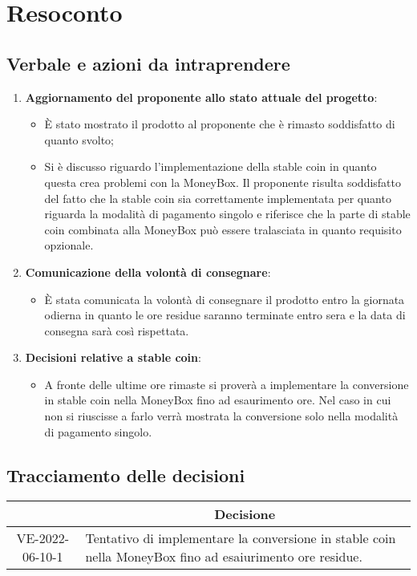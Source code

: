 \section{Resoconto}
\subsection{Verbale e azioni da intraprendere}

\begin{enumerate}
	\item \textbf{Aggiornamento del proponente allo stato attuale del progetto}:
	\begin{itemize}
		\item È stato mostrato il prodotto al proponente che è rimasto soddisfatto di quanto svolto;
		\item Si è discusso riguardo l'implementazione della stable coin\glo{} in quanto questa crea problemi con la MoneyBox. Il proponente risulta soddisfatto del fatto che la stable coin\glo{} sia correttamente implementata per quanto riguarda la modalità di pagamento singolo e riferisce che la parte di stable coin\glo{} combinata alla MoneyBox può essere tralasciata in quanto requisito opzionale.
	\end{itemize}
	\item \textbf{Comunicazione della volontà di consegnare}:
	\begin{itemize}
		\item È stata comunicata la volontà di consegnare il prodotto entro la giornata odierna in quanto le ore residue saranno terminate entro sera e la data di consegna sarà così rispettata.
	\end{itemize}
	\item \textbf{Decisioni relative a stable coin}:
	\begin{itemize}
		\item A fronte delle ultime ore rimaste si proverà a implementare la conversione in stable coin\glo{} nella MoneyBox fino ad esaurimento ore. Nel caso in cui non si riuscisse a farlo verrà mostrata la conversione solo nella modalità di pagamento singolo.
	\end{itemize}
\end{enumerate}

\pagebreak

\subsection{Tracciamento delle decisioni}

\begin{table}[H]
	\centering
	\renewcommand{\arraystretch}{1.8}
	\begin{tabular}{c | p{10cm}}
		\rowcolor[HTML]{125E28}
		\multicolumn{1}{c}{\color[HTML]{FFFFFF} \textbf{ID}} &
		\multicolumn{1}{c}{\color[HTML]{FFFFFF} \textbf{Decisione}} \\
		\hline
		VE-2022-06-10-1 & Tentativo di implementare la conversione in stable coin\glo{} nella MoneyBox fino ad esaiurimento ore residue. \\ \hline
	\end{tabular}
\end{table}